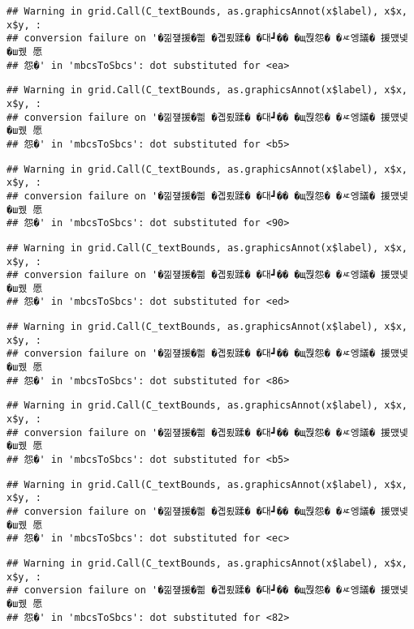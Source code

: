 \documentclass[
]{article}
\begin{document}
\begin{verbatim}
## Warning in grid.Call(C_textBounds, as.graphicsAnnot(x$label), x$x, x$y, :
## conversion failure on '�낆쟾援�쁾 �곕룄蹂� �대┛�� �щ쭩怨� �ㅼ엥議� 援먰넻�ш퀬 愿
## 怨�' in 'mbcsToSbcs': dot substituted for <ea>
\end{verbatim}

\begin{verbatim}
## Warning in grid.Call(C_textBounds, as.graphicsAnnot(x$label), x$x, x$y, :
## conversion failure on '�낆쟾援�쁾 �곕룄蹂� �대┛�� �щ쭩怨� �ㅼ엥議� 援먰넻�ш퀬 愿
## 怨�' in 'mbcsToSbcs': dot substituted for <b5>
\end{verbatim}

\begin{verbatim}
## Warning in grid.Call(C_textBounds, as.graphicsAnnot(x$label), x$x, x$y, :
## conversion failure on '�낆쟾援�쁾 �곕룄蹂� �대┛�� �щ쭩怨� �ㅼ엥議� 援먰넻�ш퀬 愿
## 怨�' in 'mbcsToSbcs': dot substituted for <90>
\end{verbatim}

\begin{verbatim}
## Warning in grid.Call(C_textBounds, as.graphicsAnnot(x$label), x$x, x$y, :
## conversion failure on '�낆쟾援�쁾 �곕룄蹂� �대┛�� �щ쭩怨� �ㅼ엥議� 援먰넻�ш퀬 愿
## 怨�' in 'mbcsToSbcs': dot substituted for <ed>
\end{verbatim}

\begin{verbatim}
## Warning in grid.Call(C_textBounds, as.graphicsAnnot(x$label), x$x, x$y, :
## conversion failure on '�낆쟾援�쁾 �곕룄蹂� �대┛�� �щ쭩怨� �ㅼ엥議� 援먰넻�ш퀬 愿
## 怨�' in 'mbcsToSbcs': dot substituted for <86>
\end{verbatim}

\begin{verbatim}
## Warning in grid.Call(C_textBounds, as.graphicsAnnot(x$label), x$x, x$y, :
## conversion failure on '�낆쟾援�쁾 �곕룄蹂� �대┛�� �щ쭩怨� �ㅼ엥議� 援먰넻�ш퀬 愿
## 怨�' in 'mbcsToSbcs': dot substituted for <b5>
\end{verbatim}

\begin{verbatim}
## Warning in grid.Call(C_textBounds, as.graphicsAnnot(x$label), x$x, x$y, :
## conversion failure on '�낆쟾援�쁾 �곕룄蹂� �대┛�� �щ쭩怨� �ㅼ엥議� 援먰넻�ш퀬 愿
## 怨�' in 'mbcsToSbcs': dot substituted for <ec>
\end{verbatim}

\begin{verbatim}
## Warning in grid.Call(C_textBounds, as.graphicsAnnot(x$label), x$x, x$y, :
## conversion failure on '�낆쟾援�쁾 �곕룄蹂� �대┛�� �щ쭩怨� �ㅼ엥議� 援먰넻�ш퀬 愿
## 怨�' in 'mbcsToSbcs': dot substituted for <82>
\end{verbatim}
\end{document}
